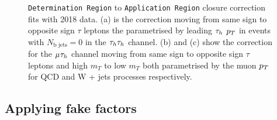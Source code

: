 \begin{figure}[!hbtp]
\centering
\caption{\texttt{Determination Region} to \texttt{Application Region} closure correction fits with 2018 data. (a) is the correction moving from same sign to opposite sign $\tau$ leptons the parametrised by leading $\tau_{h}$ $p_{T}$ in events with $N_{\text{b jets}}=0$ in the $\tau_{h}\tau_{h}$ channel. (b) and (c) show the correction for the $\mu_{}\tau_{h}$ channel moving from same sign to opposite sign $\tau$ leptons and high $m_{T}$ to low $m_{T}$ both parametrised by the muon $p_{T}$ for QCD and W + jets processes respectively.}
\label{fig:ff_dr_to_ar}
\end{figure}

\subsection{Applying fake factors}
\label{sec:ff_applying}

